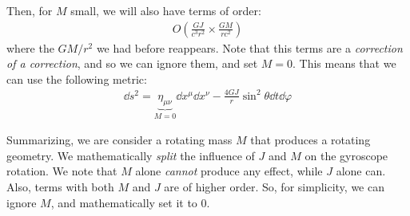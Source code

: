 \documentclass[../template.tex]{subfiles}
\begin{document}
Then, for $M$ small, we will also have terms of order: 
\begin{align*}
    O\left(\frac{GJ}{c^3 r^2}  \times \frac{GM}{rc^2} \right)
\end{align*}
where the $GM/r^2$ we had before reappears. Note that this terms are a \textit{correction of a correction}, and so we can ignore them, and set $M=0$. This means that we can use the following metric:
\begin{align*}
    \dd{s}^2 = \underbrace{\eta_{\mu \nu}}_{M=0} \dd{x}^\mu \dd{x}^\nu - \frac{4 GJ}{r} \sin^2 \theta \dd{t} \dd{\varphi} 
\end{align*}   

Summarizing, we are consider a rotating mass $M$ that produces a rotating geometry. We mathematically \textit{split} the influence of $J$ and $M$ on the gyroscope rotation. We note that $M$ alone \textit{cannot} produce any effect, while $J$ alone can. Also, terms with both $M$ and $J$ are of higher order. So, for simplicity, we can ignore $M$, and mathematically set it to $0$.  
\end{document}
